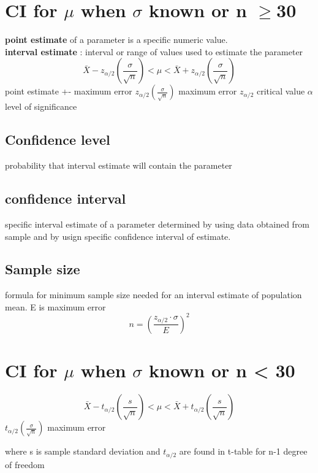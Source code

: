 \documentclass[11pt]{amsart}
\begin{document}
  \section{CI for $\mu$ when $\sigma $ known or n $\ge $30}
  \textbf{point estimate} of a parameter is a specific numeric value.\\
  \textbf{interval estimate} : interval or range of values used to estimate
  the parameter
  \begin{equation}
    \bar X - z_{\alpha/2}(\frac{\sigma}{\sqrt{n}}) < \mu < \bar X +z_{\alpha/2}(\frac{\sigma}{\sqrt{n}})
  \end{equation}
  point estimate +- maximum error
  $z_{\alpha/2}(\frac{\sigma}{\sqrt{n}})$  maximum error
  $z_{\alpha/2}$ critical value
  $\alpha$ level of significance
  \subsection{Confidence level}
  \par probability that interval estimate will contain the parameter
  \subsection{confidence interval}
  \par specific interval estimate of a parameter determined by using data
  obtained from sample and by usign specific confidence interval of
  estimate.
  \subsection{Sample size}
  \par formula for minimum sample size needed for an interval estimate of
  population mean. E is maximum error
  \begin{equation}
    n=(\frac{z_{\alpha/2} \cdot \sigma}{E})^2
  \end{equation}
  \section{CI for $\mu$ when $\sigma $ known or n < 30}
  \begin{equation}
    \bar X - t_{\alpha/2}(\frac{s}{\sqrt{n}}) < \mu < \bar X
    +t_{\alpha/2}(\frac{s}{\sqrt{n}})
  \end{equation}
  $t_{\alpha/2}(\frac{\sigma}{\sqrt{n}})$  maximum error
  \par where s is sample standard deviation and $t_{\alpha/2}$ are found in
  t-table for n-1 degree of freedom
\end{document}
